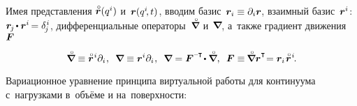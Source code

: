 \begin{otherlanguage}{russian}
Имея представления ${\initialvector(q^i)}$ и~${\bm{r}(q^i\hspace{-0.4ex}, t)}$,
вводим базис~${\bm{r}_i \equiv \partial_i \bm{r}}\hspace{-0.2ex}$,
взаимный базис~${\bm{r}^i}$: ${\currentvector_{\hspace{-0.2ex}j} \hspace{-0.2ex} \dotp \currentvector^i \hspace{-0.25ex} = \delta^{\hspace{.1ex}i}_{\hspace{-0.2ex}j}}$,
дифференциальные операторы~$\boldnablacircled$ и~${\hspace{-0.16ex}\bm{\nabla}\hspace{-0.2ex}}\hspace{-0.1ex}$,
а~также градиент движения~$\bm{F}$

\nopagebreak\vspace{-0.1em}\begin{equation}
\boldnablacircled \equiv \initialvector^{\hspace{.1ex}i} \partial_i
\hspace{.1ex} ,
\:\;
\boldnabla \equiv \currentvector^i \partial_i
\hspace{.1ex} ,
\:\;
\boldnabla = \motiongradient^{\expminusT} \hspace{-0.32ex} \dotp \boldnablacircled
,
\:\;
\motiongradient \equiv \hspace{-0.16ex}
\boldnablacircled \currentvector^{\T} \hspace{-0.5ex}
= \currentvector_i \hspace{.2ex} \initialvector^{\hspace{.1ex}i}
\hspace{-0.25ex} .
\end{equation}

Вариационное уравнение принципа виртуальной работы для континуума с~нагрузками в~объёме и на~поверхности:


\end{otherlanguage}
